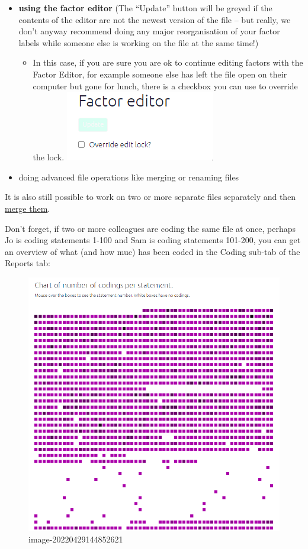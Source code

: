 \documentclass[
]{book}
\providecommand{\tightlist}{%
  \setlength{\itemsep}{0pt}\setlength{\parskip}{0pt}}
\begin{document}
\begin{itemize}
\tightlist
\item
  \textbf{using the factor editor} (The ``Update'' button will be greyed if the contents of the editor are not the newest version of the file -- but really, we don't anyway recommend doing any major reorganisation of your factor labels while someone else is working on the file at the same time!)

  \begin{itemize}
  \tightlist
  \item
    In this case, if you are sure you are ok to continue editing factors with the Factor Editor, for example someone else has left the file open on their computer but gone for lunch, there is a checkbox you can use to override the lock. \includegraphics{_assets/image-20220624201919524.png}
  \end{itemize}
\item
  doing advanced file operations like merging or renaming files
\end{itemize}

It is also still possible to work on two or more separate files separately and then \href{xmerging-files}{merge them}.

Don't forget, if two or more colleagues are coding the same file at once, perhaps Jo is coding statements 1-100 and Sam is coding statements 101-200, you can get an overview of what (and how muc) has been coded in the Coding sub-tab of the Reports tab:

\begin{figure}
\centering
\includegraphics{_assets/image-20220429144852621.png}
\caption{image-20220429144852621}
\end{figure}
\end{document}
